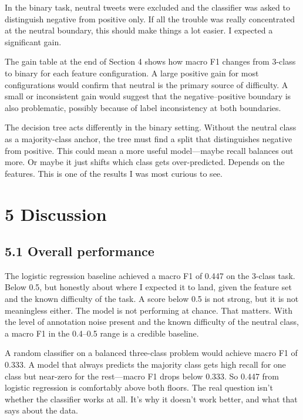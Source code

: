 \documentclass[12pt]{article}
\begin{document}
In the binary task, neutral tweets were excluded and the classifier was asked to distinguish negative from positive only. If all the trouble was really concentrated at the neutral boundary, this should make things a lot easier. I expected a significant gain.

The gain table at the end of Section 4 shows how macro F1 changes from 3-class to binary for each feature configuration. A large positive gain for most configurations would confirm that neutral is the primary source of difficulty. A small or inconsistent gain would suggest that the negative--positive boundary is also problematic, possibly because of label inconsistency at both boundaries.

The decision tree acts differently in the binary setting. Without the neutral class as a majority-class anchor, the tree must find a split that distinguishes negative from positive. This could mean a more useful model---maybe recall balances out more. Or maybe it just shifts which class gets over-predicted. Depends on the features. This is one of the results I was most curious to see.



\section*{5 Discussion}



\subsection*{5.1 Overall performance}



The logistic regression baseline achieved a macro F1 of 0.447 on the 3-class task. Below 0.5, but honestly about where I expected it to land, given the feature set and the known difficulty of the task. A score below 0.5 is not strong, but it is not meaningless either. The model is not performing at chance. That matters. With the level of annotation noise present and the known difficulty of the neutral class, a macro F1 in the 0.4--0.5 range is a credible baseline.

A random classifier on a balanced three-class problem would achieve macro F1 of 0.333. A model that always predicts the majority class gets high recall for one class but near-zero for the rest---macro F1 drops below 0.333. So 0.447 from logistic regression is comfortably above both floors. The real question isn't whether the classifier works at all. It's why it doesn't work better, and what that says about the data.
\end{document}
